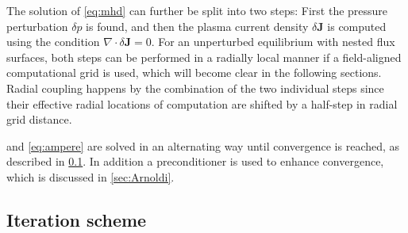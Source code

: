 \documentclass[a4paper, twoside, 10pt, english]{article}
\numberwithin{equation}{section}
\let\vec\symbf
\newcommand*\divg{\ensuremath{\nabla \cdot}}
\begin{document}
The solution of \cref{eq:mhd} can further be split into two steps: First the pressure perturbation $\delta p$ is found, and then the plasma current density $\delta \vec{J}$ is computed using the condition $\divg \delta \vec{J} = 0$. For an unperturbed equilibrium with nested flux surfaces, both steps can be performed in a radially local manner if a field-aligned computational grid is used, which will become clear in the following sections. Radial coupling happens by the combination of the two individual steps since their effective radial locations of computation are shifted by a half-step in radial grid distance.

 and \cref{eq:ampere} are solved in an alternating way until convergence is reached, as described in \cref{sec:iteration}. In addition a preconditioner is used to enhance convergence, which is discussed in \cref{sec:Arnoldi}.

\subsection{Iteration scheme}
\label{sec:iteration}
\end{document}
